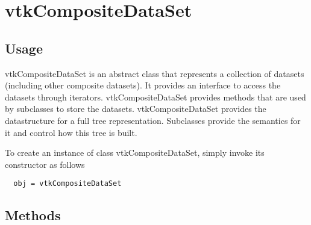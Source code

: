 \section{vtkCompositeDataSet}

\subsection{Usage}

 vtkCompositeDataSet is an abstract class that represents a collection
 of datasets (including other composite datasets). It
 provides an interface to access the datasets through iterators.
 vtkCompositeDataSet provides methods that are used by subclasses to store the
 datasets.
 vtkCompositeDataSet provides the datastructure for a full tree 
 representation. Subclasses provide the semantics for it and control how
 this tree is built.

To create an instance of class vtkCompositeDataSet, simply
invoke its constructor as follows
\begin{verbatim}
  obj = vtkCompositeDataSet
\end{verbatim}
\subsection{Methods}

